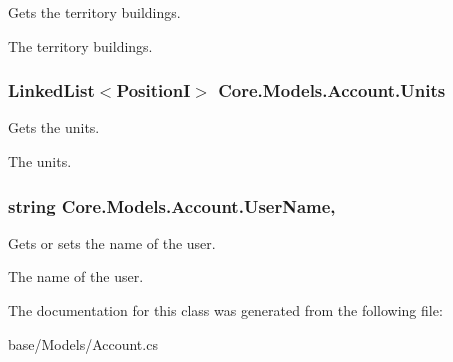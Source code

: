 Gets the territory buildings. 

The territory buildings.\hypertarget{classCore_1_1Models_1_1Account_a474b556453f43f821b4b3c79401288ac}{}
\subsubsection[{Units}]{\setlength{\rightskip}{0pt plus 5cm}Linked\+List$<${\bf Position\+I}$>$ Core.\+Models.\+Account.\+Units\hspace{0.3cm}{\ttfamily [get]}}\label{classCore_1_1Models_1_1Account_a474b556453f43f821b4b3c79401288ac}


Gets the units. 

The units.\hypertarget{classCore_1_1Models_1_1Account_a1ffe9e8e0cfd0a45234e457a39c2de0f}{}
\subsubsection[{User\+Name}]{\setlength{\rightskip}{0pt plus 5cm}string Core.\+Models.\+Account.\+User\+Name\hspace{0.3cm}{\ttfamily [get]}, {\ttfamily [set]}}\label{classCore_1_1Models_1_1Account_a1ffe9e8e0cfd0a45234e457a39c2de0f}


Gets or sets the name of the user. 

The name of the user.

The documentation for this class was generated from the following file\+:\begin{DoxyCompactItemize}
\item 
base/\+Models/Account.\+cs\end{DoxyCompactItemize}
